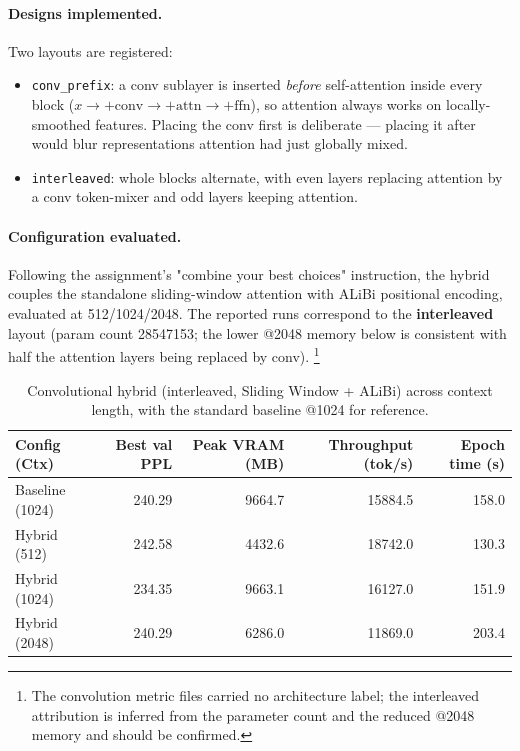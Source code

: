 \documentclass[11pt]{article}
\begin{document}
\paragraph{Designs implemented.} Two layouts are registered:
\begin{itemize}[nosep]
\item \texttt{conv\_prefix}: a conv sublayer is inserted \emph{before}
self-attention inside every block ($x \to {+}\text{conv} \to {+}\text{attn} \to
{+}\text{ffn}$), so attention always works on locally-smoothed features.
Placing the conv first is deliberate --- placing it after would blur
representations attention had just globally mixed.
\item \texttt{interleaved}: whole blocks alternate, with even layers replacing
attention by a conv token-mixer and odd layers keeping attention.
\end{itemize}

\paragraph{Configuration evaluated.} Following the assignment's "combine your
best choices" instruction, the hybrid couples the standalone sliding-window
attention with ALiBi positional encoding, evaluated at 512/1024/2048. The
reported runs correspond to the \textbf{interleaved} layout (param count
\num{28547153}; the lower @2048 memory below is consistent with half the
attention layers being replaced by conv).%
\footnote{The convolution metric files carried no architecture label; the
interleaved attribution is inferred from the parameter count and the reduced
@2048 memory and should be confirmed.}

\begin{table}[H]
\centering
\caption{Convolutional hybrid (interleaved, Sliding Window + ALiBi) across
context length, with the standard baseline @1024 for reference.}
\label{tab:conv}
\begin{tabular}{lrrrr}
\toprule
Config (Ctx) & Best val PPL & Peak VRAM (MB) & Throughput (tok/s) & Epoch time (s) \\
\midrule
Baseline (1024)       & 240.29 & 9664.7 & 15884.5 & 158.0 \\
\midrule
Hybrid (512)          & 242.58 & 4432.6 & 18742.0 & 130.3 \\
Hybrid (1024)         & 234.35 & 9663.1 & 16127.0 & 151.9 \\
Hybrid (2048)         & 240.29 & 6286.0 & 11869.0 & 203.4 \\
\bottomrule
\end{tabular}
\end{table}
\end{document}
